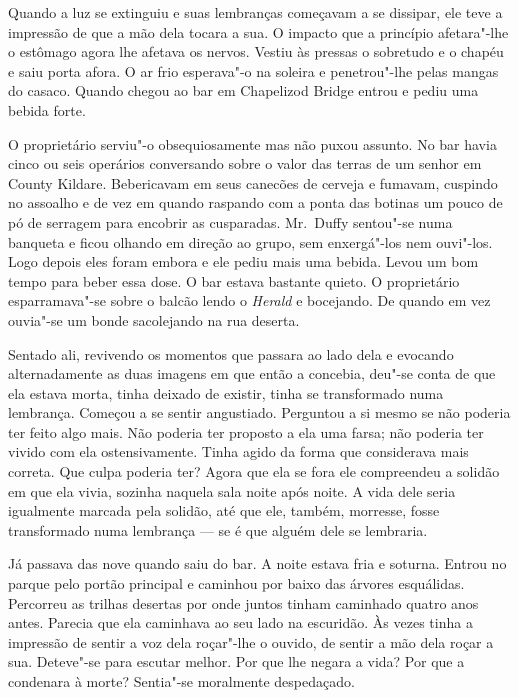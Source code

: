 Quando a luz se extinguiu e suas lembranças começavam a se dissipar, ele teve a
impressão de que a mão dela tocara a sua.  O impacto que a princípio
afetara"-lhe o estômago agora lhe afetava os nervos.  Vestiu às pressas o
sobretudo e o chapéu e saiu porta afora.  O ar frio esperava"-o na soleira e
penetrou"-lhe pelas mangas do casaco.  Quando chegou ao bar em Chapelizod Bridge
entrou e pediu uma bebida forte.

O proprietário serviu"-o obsequiosamente mas não puxou assunto.  No bar havia
cinco ou seis operários conversando sobre o valor das terras de um senhor em
County Kildare.  Bebericavam em seus canecões de cerveja e fumavam, cuspindo no
assoalho e de vez em quando raspando com a ponta das botinas um pouco de pó de
serragem para encobrir as cusparadas.  Mr.~Duffy sentou"-se numa banqueta e
ficou olhando em direção ao grupo, sem enxergá"-los nem ouvi"-los.  Logo depois
eles foram embora e ele pediu mais uma bebida.  Levou um bom tempo para beber
essa dose.  O bar estava bastante quieto.  O proprietário esparramava"-se sobre
o balcão lendo o \textit{Herald} e bocejando.  De quando em vez ouvia"-se um
bonde sacolejando na rua deserta.

Sentado ali, revivendo os momentos que passara ao lado dela e evocando
alternadamente as duas imagens em que então a concebia, deu"-se conta de que ela
estava morta, tinha deixado de existir, tinha se transformado numa lembrança.
Começou a se sentir angustiado.  Perguntou a si mesmo se não poderia ter feito
algo mais.  Não poderia ter proposto a ela uma farsa; não poderia ter vivido
com ela ostensivamente.  Tinha agido da forma que considerava mais correta.
Que culpa poderia ter?  Agora que ela se fora ele compreendeu a solidão em que
ela vivia, sozinha naquela sala noite após noite.  A vida dele seria igualmente
marcada pela solidão, até que ele, também, morresse, fosse transformado numa
lembrança --- se é que alguém dele se lembraria.

Já passava das nove quando saiu do bar.  A noite estava fria e soturna.  Entrou
no parque pelo portão principal e caminhou por baixo das árvores esquálidas.
Percorreu as trilhas desertas por onde juntos tinham caminhado quatro anos
antes.  Parecia que ela caminhava ao seu lado na escuridão.  Às vezes tinha a
impressão de sentir a voz dela roçar"-lhe o ouvido, de sentir a mão dela roçar a
sua.  Deteve"-se para escutar melhor.  Por que lhe negara a vida?  Por que a
condenara à morte?  Sentia"-se moralmente despedaçado.

